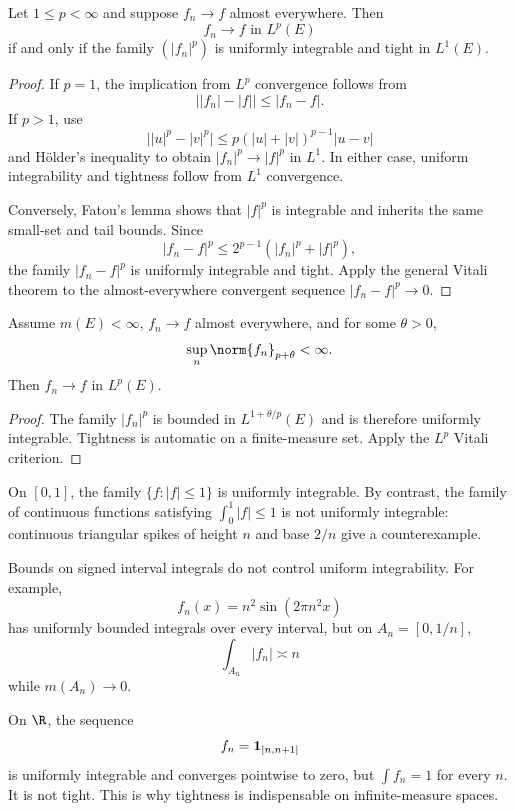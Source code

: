 \begin{thm}
Let $1\leq p<\infty$ and suppose $f_n\to f$ almost everywhere. Then
\[
f_n\to f\text{ in }L^p(E)
\]
if and only if the family $(|f_n|^p)$ is uniformly integrable and tight in $L^1(E)$.
\end{thm}

\begin{proof}
If $p=1$, the implication from $L^p$ convergence follows from
\[
\bigl||f_n|-|f|\bigr|\leq|f_n-f|.
\]
If $p>1$, use
\[
\bigl||u|^p-|v|^p\bigr|
\leq p(|u|+|v|)^{p-1}|u-v|
\]
and Hölder's inequality to obtain $|f_n|^p\to|f|^p$ in $L^1$. In either case, uniform integrability and tightness follow from $L^1$ convergence.

Conversely, Fatou's lemma shows that $|f|^p$ is integrable and inherits the same small-set and tail bounds. Since
\[
|f_n-f|^p\leq2^{p-1}(|f_n|^p+|f|^p),
\]
the family $|f_n-f|^p$ is uniformly integrable and tight. Apply the general Vitali theorem to the almost-everywhere convergent sequence $|f_n-f|^p\to0$.
\end{proof}

\begin{cor}
Assume $m(E)<\infty$, $f_n\to f$ almost everywhere, and for some $\theta>0$,
\[
\sup_n\norm{f_n}_{p+\theta}<\infty.
\]
Then $f_n\to f$ in $L^p(E)$.
\end{cor}

\begin{proof}
The family $|f_n|^p$ is bounded in $L^{1+\theta/p}(E)$ and is therefore uniformly integrable. Tightness is automatic on a finite-measure set. Apply the $L^p$ Vitali criterion.
\end{proof}

\begin{eg}
On $[0,1]$, the family $\{f:|f|\leq1\}$ is uniformly integrable. By contrast, the family of continuous functions satisfying $\int_0^1|f|\leq1$ is not uniformly integrable: continuous triangular spikes of height $n$ and base $2/n$ give a counterexample.

Bounds on signed interval integrals do not control uniform integrability. For example,
\[
f_n(x)=n^2\sin(2\pi n^2x)
\]
has uniformly bounded integrals over every interval, but on $A_n=[0,1/n]$,
\[
\int_{A_n}|f_n|\asymp n
\]
while $m(A_n)\to0$.
\end{eg}

\begin{eg}
On $\R$, the sequence
\[
f_n=\mathbf{1}_{[n,n+1]}
\]
is uniformly integrable and converges pointwise to zero, but $\int f_n=1$ for every $n$. It is not tight. This is why tightness is indispensable on infinite-measure spaces.
\end{eg}
